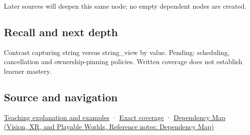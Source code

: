 Later sources will deepen this same node; no empty dependent nodes are created.

\subsection{Recall and next depth}\label{appendix-aea529eb5175-recall-and-next-depth}

Contrast capturing string versus string\_view by value. Pending: scheduling, cancellation and ownership-pinning policies. Written coverage does not establish learner mastery.

\subsection{Source and navigation}\label{appendix-aea529eb5175-source-and-navigation}

\hyperref[01-foundations-i-ch003-borrowed-views-and-deferred-work-need-an-owner-story]{Teaching explanation and examples} · \hyperref[appendix-fd090d982a15-m008---parts-113-126]{Exact coverage} · \href{../07-Vision-XR-and-Playable-Worlds/main.pdf\#nameddest=appendix-4ad47bdd269a}{Dependency Map (Vision, XR, and Playable Worlds, Reference notes: Dependency Map)}
